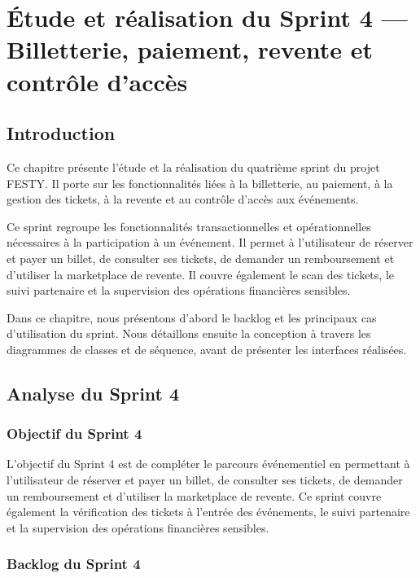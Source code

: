 ﻿%

\chapter{Étude et réalisation du Sprint 4 — Billetterie, paiement, revente et contrôle d’accès}
\label{chap:sprint4-billetterie-paiement}


\section{Introduction}


Ce chapitre présente l’étude et la réalisation du quatrième sprint du projet FESTY. Il porte sur les fonctionnalités liées à la billetterie, au paiement, à la gestion des tickets, à la revente et au contrôle d’accès aux événements.


Ce sprint regroupe les fonctionnalités transactionnelles et opérationnelles nécessaires à la participation à un événement. Il permet à l’utilisateur de réserver et payer un billet, de consulter ses tickets, de demander un remboursement et d’utiliser la marketplace de revente. Il couvre également le scan des tickets, le suivi partenaire et la supervision des opérations financières sensibles.


Dans ce chapitre, nous présentons d’abord le backlog et les principaux cas d’utilisation du sprint. Nous détaillons ensuite la conception à travers les diagrammes de classes et de séquence, avant de présenter les interfaces réalisées.


\section{Analyse du Sprint 4}


\subsection{Objectif du Sprint 4}


L’objectif du Sprint 4 est de compléter le parcours événementiel en permettant à l’utilisateur de réserver et payer un billet, de consulter ses tickets, de demander un remboursement et d’utiliser la marketplace de revente. Ce sprint couvre également la vérification des tickets à l’entrée des événements, le suivi partenaire et la supervision des opérations financières sensibles.


\subsection{Backlog du Sprint 4}


